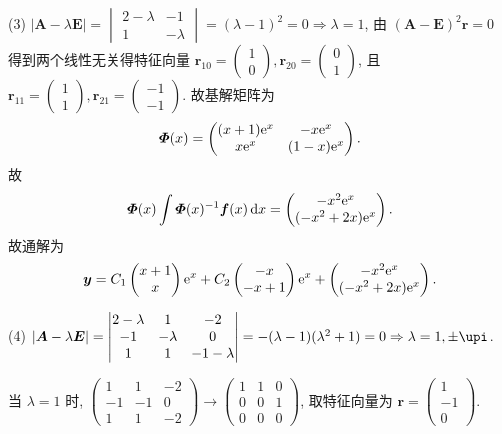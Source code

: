 \begin{solution}
  (3) $|\bm{A}-\lambda\bm{E}|=\begin{vmatrix}2-\lambda&-1\\1&-\lambda\end{vmatrix}=(\lambda-1)^2=0\Rightarrow\lambda=1$,
  由 $(\bm{A}-\bm{E})^2\bm{r}=0$ 得到两个线性无关得特征向量 
  $\bm{r}_{10}=\begin{pmatrix}1\\0\end{pmatrix},\bm{r}_{20}=\begin{pmatrix}0\\1\end{pmatrix}$, 
  且 $\bm{r}_{11}=\begin{pmatrix}1\\1\end{pmatrix},\bm{r}_{21}=\begin{pmatrix}-1\\-1\end{pmatrix}$.
  故基解矩阵为
  \[\bm{\varPhi}(x)=\begin{pmatrix}(x+1)\mathrm{e}^x&-x\mathrm{e}^x\\x\mathrm{e}^x&(1-x)\mathrm{e}^x\end{pmatrix}.\]
  故
  \[\bm{\varPhi}(x)\int\bm{\varPhi}(x)^{-1}\bm{f}(x)\mathop{}\!\mathrm{d} x
    = \begin{pmatrix}-x^2\mathrm{e}^x\\(-x^2+2x)\mathrm{e}^x\end{pmatrix}.\]
  故通解为
  \[\bm{y} = C_1\begin{pmatrix}x+1\\x\end{pmatrix}\mathrm{e}^x
    + C_2\begin{pmatrix}-x\\-x+1\end{pmatrix}\mathrm{e}^x
    + \begin{pmatrix}-x^2\mathrm{e}^x\\(-x^2+2x)\mathrm{e}^x\end{pmatrix}.\]

  (4) $|\bm{A}-\lambda\bm{E}|=\begin{vmatrix}2-\lambda&1&-2\\-1&-\lambda&0\\1&1&-1-\lambda\end{vmatrix}=-(\lambda-1)(\lambda^2+1)=0\Rightarrow\lambda=1,\pm\upi$.

  当 $\lambda=1$ 时, $\begin{pmatrix}1&1&-2\\-1&-1&0\\1&1&-2\end{pmatrix}\to\begin{pmatrix}1&1&0\\0&0&1\\0&0&0\end{pmatrix}$, 
  取特征向量为 $\bm{r}=\begin{pmatrix}1\\-1\\0\end{pmatrix}$.


\end{solution}
